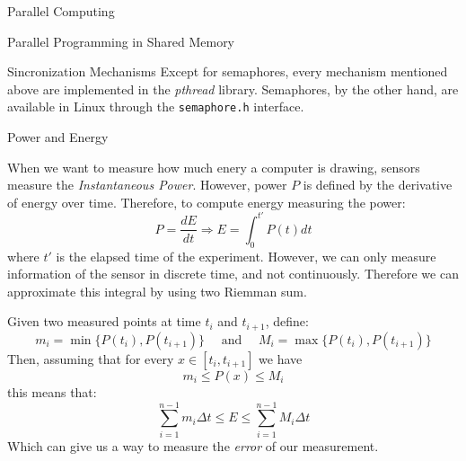 \begin{section}{Parallel Computing}
\begin{subsection}{Parallel Programming in Shared Memory}
\begin{subsubsection}{Sincronization Mechanisms}
Except for semaphores, every mechanism mentioned above are implemented in
the \textit{pthread} library. Semaphores, by the other hand, are available
in Linux through the \texttt{semaphore.h} interface.


\end{subsubsection}

\begin{section}{Power and Energy}

When we want to measure how much enery a computer is drawing, sensors
measure the \textit{Instantaneous Power}. However, power $P$ is defined
by the derivative of energy over time. Therefore, to compute energy
measuring the power:
$$P = \frac{dE}{dt} \Rightarrow E = \int_{0}^{t'} P(t)dt$$
where $t'$ is the elapsed time of the experiment. However, we can only
measure information of the sensor in discrete time, and not continuously.
Therefore we can approximate this integral by using two Riemman sum.

Given two measured points at time $t_i$ and $t_{i+1}$, define:
$$m_i = \min\{P(t_i), P(t_{i+1})\} \quad \text{ and } \quad M_i = \max\{P(t_i), P(t_{i+1})\}$$
Then, assuming that for every $x \in [t_i, t_{i+1}]$ we have
$$m_i \leq P(x) \leq M_i$$
this means that:
$$\sum_{i=1}^{n-1} m_i\Delta t \leq E \leq \sum_{i=1}^{n-1} M_i\Delta t$$
Which can give us a way to measure the \textit{error} of our measurement.


\end{section}


\end{subsection}
\end{section}
